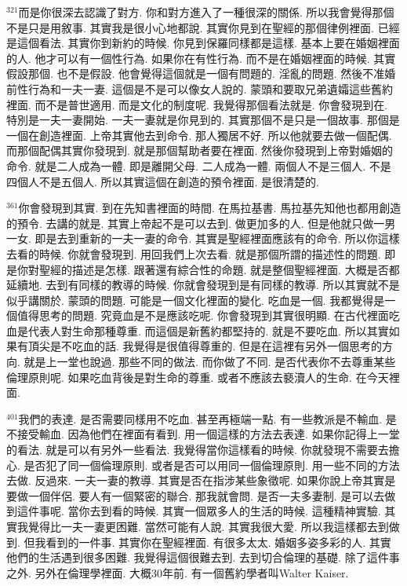 \documentclass{book}
\begin{document}
$^{321}$而是你很深去認識了對方.
你和對方進入了一種很深的關係.
所以我會覺得那個不是只是用敘事.
其實我是很小心地都說.
其實你見到在聖經的那個律例裡面.
已經是這個看法.
其實你到新約的時候.
你見到保羅同樣都是這樣.
基本上要在婚姻裡面的人.
他才可以有一個性行為.
如果你在有性行為.
而不是在婚姻裡面的時候.
其實假設那個.
也不是假設.
他會覺得這個就是一個有問題的.
淫亂的問題.
然後不准婚前性行為和一夫一妻.
這個是不是可以像女人說的.
蒙頭和要取兄弟遺孀這些舊約裡面.
而不是普世適用.
而是文化的制度呢.
我覺得那個看法就是.
你會發現到在.
特別是一夫一妻開始.
一夫一妻就是你見到的.
其實那個不是只是一個故事.
那個是一個在創造裡面.
上帝其實他去到命令.
那人獨居不好.
所以他就要去做一個配偶.
而那個配偶其實你發現到.
就是那個幫助者要在裡面.
然後你發現到上帝對婚姻的命令.
就是二人成為一體.
即是離開父母.
二人成為一體.
兩個人不是三個人.
不是四個人不是五個人.
所以其實這個在創造的預令裡面.
是很清楚的.

$^{361}$你會發現到其實.
到在先知書裡面的時間.
在馬拉基書.
馬拉基先知他也都用創造的預令.
去講的就是.
其實上帝起不是可以去到.
做更加多的人.
但是他就只做一男一女.
即是去到重新的一夫一妻的命令.
其實是聖經裡面應該有的命令.
所以你這樣去看的時候.
你就會發現到.
用回我們上次去看.
就是那個所謂的描述性的問題.
即是你對聖經的描述是怎樣.
跟著還有綜合性的命題.
就是整個聖經裡面.
大概是否都延續地.
去到有同樣的教導的時候.
你就會發現到是有同樣的教導.
所以其實就不是似乎講關於.
蒙頭的問題.
可能是一個文化裡面的變化.
吃血是一個.
我都覺得是一個值得思考的問題.
究竟血是不是應該吃呢.
你會發現到其實很明顯.
在古代裡面吃血是代表人對生命那種尊重.
而這個是新舊約都堅持的.
就是不要吃血.
所以其實如果有頂尖是不吃血的話.
我覺得是很值得尊重的.
但是在這裡有另外一個思考的方向.
就是上一堂也說過.
那些不同的做法.
而你做了不同.
是否代表你不去尊重某些倫理原則呢.
如果吃血背後是對生命的尊重.
或者不應該去褻瀆人的生命.
在今天裡面.

$^{401}$我們的表達.
是否需要同樣用不吃血.
甚至再極端一點.
有一些教派是不輸血.
是不接受輸血.
因為他們在裡面有看到.
用一個這樣的方法去表達.
如果你記得上一堂的看法.
就是可以有另外一些看法.
我覺得當你這樣看的時候.
你就發現不需要去擔心.
是否犯了同一個倫理原則.
或者是否可以用同一個倫理原則.
用一些不同的方法去做.
反過來.
一夫一妻的教導.
其實是否在指涉某些象徵呢.
如果你說上帝其實是要做一個伴侶.
要人有一個緊密的聯合.
那我就會問.
是否一夫多妻制.
是可以去做到這件事呢.
當你去到看的時候.
其實一個眾多人的生活的時候.
這種精神實驗.
其實我覺得比一夫一妻更困難.
當然可能有人說.
其實我很大愛.
所以我這樣都去到做到.
但我看到的一件事.
其實你在聖經裡面.
有很多太太.
婚姻多姿多彩的人.
其實他們的生活遇到很多困難.
我覺得這個很難去到.
去到切合倫理的基礎.
除了這件事之外.
另外在倫理學裡面.
大概30年前.
有一個舊約學者叫Walter Kaiser.
\end{document}

